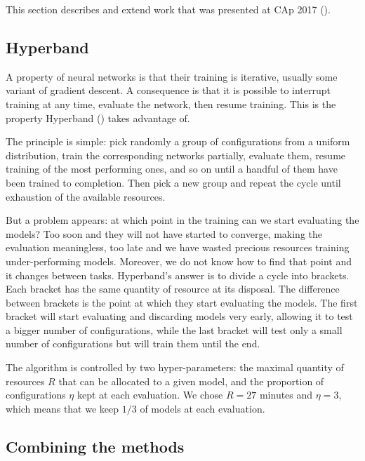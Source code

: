 This section describes and extend work that was presented at CAp 2017 (\textcite{bertrand2017CAp}).

\subsection{Hyperband}
\label{ssec:hyperband}

A property of neural networks is that their training is iterative, usually some variant of gradient descent. A consequence is that it is possible to interrupt training at any time, evaluate the network, then resume training. This is the property Hyperband (\textcite{li2017ICLR}) takes advantage of.

The principle is simple: pick randomly a group of configurations from a uniform distribution, train the corresponding networks partially, evaluate them, resume training of the most performing ones, and so on until a handful of them have been trained to completion. Then pick a new group and repeat the cycle until exhaustion of the available resources.

But a problem appears: at which point in the training can we start evaluating the models? Too soon and they will not have started to converge, making the evaluation meaningless, too late and we have wasted precious resources training under-performing models. Moreover, we do not know how to find that point and it changes between tasks. Hyperband's answer is to divide a cycle into brackets. Each bracket has the same quantity of resource at its disposal. The difference between brackets is the point at which they start evaluating the models. The first bracket will start evaluating and discarding models very early, allowing it to test a bigger number of configurations, while the last bracket will test only a small number of configurations but will train them until the end.

The algorithm is controlled by two hyper-parameters: the maximal quantity of resources $R$ that can be allocated to a given model, and the proportion of configurations $\eta$ kept at each evaluation. We chose $R = 27$ minutes and $\eta = 3$, which means that we keep $1/3$ of models at each evaluation.

\subsection{Combining the methods}


